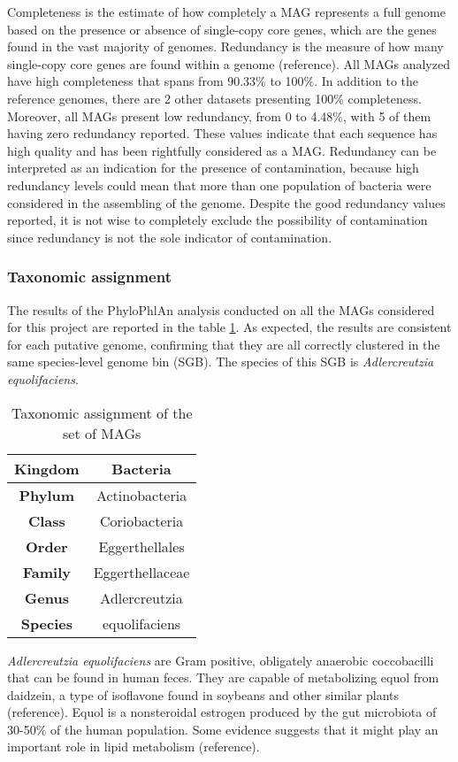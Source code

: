 Completeness is the estimate of how completely a MAG represents a full genome based on the presence or absence of single-copy core genes, which are the genes found in the vast majority of genomes. Redundancy is the measure of how many single-copy core genes are found within a genome (reference). All MAGs analyzed have high completeness that spans from 90.33\% to 100\%. In addition to the reference genomes, there are 2 other datasets presenting 100\% completeness. Moreover, all MAGs present low redundancy, from 0 to 4.48\%, with 5 of them having zero redundancy reported. These values indicate that each sequence has high quality and has been rightfully considered as a MAG. Redundancy can be interpreted as an indication for the presence of contamination, because high redundancy levels could mean that more than one population of bacteria were considered in the assembling of the genome. Despite the good redundancy values reported, it is not wise to completely exclude the possibility of contamination since redundancy is not the sole indicator of contamination.

\subsubsection*{Taxonomic assignment}

The results of the PhyloPhlAn analysis conducted on all the MAGs considered for this project are reported in the table \ref{tab:taxonomy}. As expected, the results are consistent for each putative genome, confirming that they are all correctly clustered in the same species-level genome bin (SGB). The species of this SGB is \textit{Adlercreutzia equolifaciens}.\\

\begin{table}[h]
\centering
\begin{tabular}{|c|c|}
    \hline
    \textbf{Kingdom} & Bacteria \\
    \hline
    \textbf{Phylum} & Actinobacteria \\
    \hline
    \textbf{Class} & Coriobacteria \\
    \hline
    \textbf{Order} & Eggerthellales \\
    \hline
    \textbf{Family} & Eggerthellaceae \\
    \hline
    \textbf{Genus} & Adlercreutzia \\
    \hline
    \textbf{Species} & equolifaciens \\
    \hline
\end{tabular}
\caption{Taxonomic assignment of the set of MAGs}
\label{tab:taxonomy}
\end{table}

\textit{Adlercreutzia equolifaciens} are Gram positive, obligately anaerobic coccobacilli that can be found in human feces. They are capable of metabolizing equol from daidzein, a type of isoflavone found in soybeans and other similar plants (reference). Equol is a nonsteroidal estrogen produced by the gut microbiota of 30-50\% of the human population. Some evidence suggests that it might play an important role in lipid metabolism (reference).